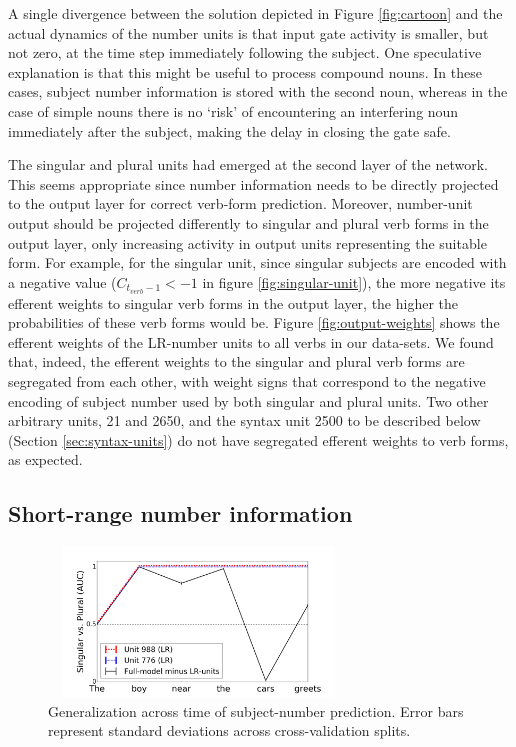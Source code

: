 A single divergence between the solution depicted in Figure \ref{fig:cartoon} and the actual dynamics of the number units is that input gate activity is smaller, but not zero, at the time step immediately following the subject. One speculative explanation is that this might be useful to process compound nouns. In these cases, subject number information is stored with the second noun, whereas in the case of simple nouns there is no `risk' of encountering an interfering noun immediately after the subject, making the delay in closing the gate safe.


The singular and plural units had emerged at the second layer of the network. This seems appropriate since number information needs to be directly projected to the output layer for correct verb-form prediction. Moreover, number-unit output should be projected differently to singular and plural verb forms in the output layer, only increasing activity in output units representing the suitable form. For example, for the singular unit, since singular subjects are encoded with a negative value ($C_{t_{verb}-1}<-1$ in figure \ref{fig:singular-unit}), the more negative its efferent weights to singular verb forms in the output layer, the higher the probabilities of these verb forms would be. Figure \ref{fig:output-weights} shows the efferent weights of the LR-number units to all verbs in our data-sets. We found that, indeed, the efferent weights to the singular and plural verb forms are segregated from each other, with weight signs that correspond to the negative encoding of subject number used by both singular and plural units. Two other arbitrary units, \unit{2}{1} and \unit{2}{650}, and the syntax unit \unit{2}{500} to be described below (Section \ref{sec:syntax-units}) do not have segregated efferent weights to verb forms, as expected. 


\subsection{Short-range number information}
\begin{figure}
    \centering
    \includegraphics[height=4cm, width=8cm]{Figures/GAT1d_cell_.png}
    \caption{Generalization across time of subject-number prediction. Error bars represent standard deviations across cross-validation splits.}
    \label{fig:GAT}
\end{figure}

